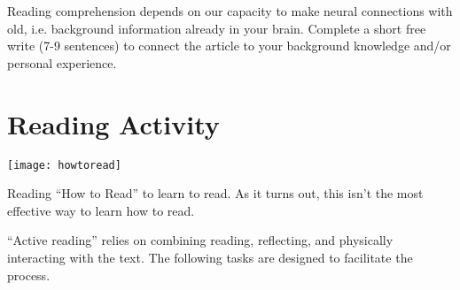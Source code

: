 \documentclass{tufte-handout}\usepackage[]{graphicx}\usepackage[]{color}
\begin{document}
Reading comprehension depends on our capacity to make neural connections with old, i.e. background information already in your brain. Complete a short free write (7-9 sentences) to connect the article to your background knowledge and/or personal experience.



\section{Reading Activity}
\begin{marginfigure}
	\texttt{[image: howtoread]}
	\label{fig:howtoread}
	\caption{Reading ``How to Read'' to learn to read. As it turns out, this isn't the most effective way to learn how to read.}
\end{marginfigure}

``Active reading'' relies on combining reading, reflecting, and physically interacting with the text. The following tasks are designed to facilitate the process.
\end{document}
